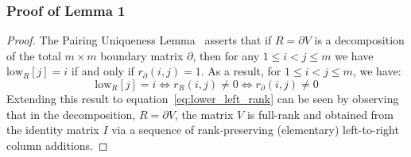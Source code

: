 \documentclass[12pt]{article}
\numberwithin{equation}{section}
\newcommand{\+}{%
	\raisebox{0.18ex}{\scaleobj{0.55}{+}}
}
\theoremstyle{definition}
\begin{document}
\subsubsection*{Proof of Lemma 1}
\begin{proof}
	The Pairing Uniqueness Lemma~\cite{dey2022computational} asserts that if $R = \partial V$ is a decomposition of the total $m \times m$ boundary matrix $\partial$, then for any $1 \leq i < j \leq m$ we have $\mathrm{low}_R[j] = i$ if and only if $r_\partial(i,j) = 1$. 
	As a result, for $1 \leq i < j \leq m$, we have:
\begin{equation}
	\mathrm{low}_R[j] = i \iff r_R(i,j) \neq 0 \iff r_\partial(i,j) \neq 0
\end{equation} 
Extending this result to equation~\eqref{eq:lower_left_rank} can be seen by observing that in the decomposition, $R = \partial V$, the matrix $V$ is full-rank and obtained from the identity matrix $I$ via a sequence of rank-preserving (elementary) left-to-right column additions.  
\end{proof}
\end{document}
